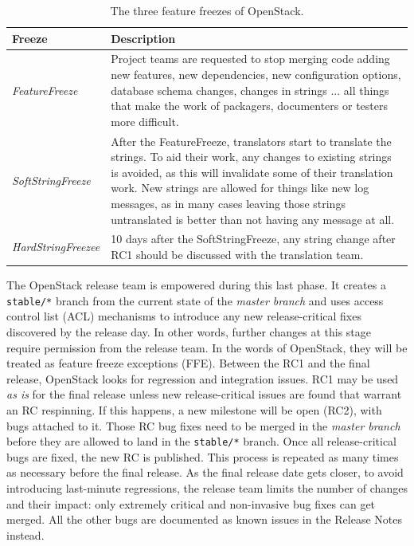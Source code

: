 \documentclass[dvipsnames]{interact}
\theoremstyle{plain}\newtheorem{theorem}{Theorem}[section]
\theoremstyle{definition}
\theoremstyle{remark}
\begin{document}
\begin{table}
\centering
\renewcommand{\arraystretch}{1.3}
\caption{The three feature freezes of OpenStack.\label{t:3freezes}}
\begin{tabularx}{\textwidth}[]{
m{}
m{}
}
\toprule
Freeze & Description \\
\midrule 
\emph{FeatureFreeze} & Project teams are requested to stop merging code adding new features, new dependencies, new configuration options, database schema changes, changes in strings ... all things that make the work of packagers, documenters or testers more difficult. \\
\emph{SoftStringFreeze} &  After the FeatureFreeze, translators start to translate the strings. To aid their work, any changes to existing strings is avoided, as this will invalidate some of their translation work. New strings are allowed for things like new log messages, as in many cases leaving those strings untranslated is better than not having any message at all.\\
\emph{HardStringFreezee} & 10 days after the SoftStringFreeze,  any string change after RC1 should be discussed with the translation team.\\
\bottomrule
\end{tabularx}
\end{table}


The OpenStack release team is empowered during this last phase. It creates a \texttt{stable/*} branch from the current state of the \emph{master branch} and uses access control list (ACL) mechanisms to introduce any new release-critical fixes discovered by the release day.  In other words, further changes at this stage require permission from the release team. In the words of OpenStack, they will be treated as feature freeze exceptions (FFE). Between the RC1 and the final release, OpenStack looks for regression and integration issues. RC1 may be used \emph{as is} for the final release unless new release-critical issues are found that warrant an RC respinning. If this happens, a new milestone will be open (RC2), with bugs attached to it. Those RC bug fixes need to be merged in the \emph{master branch} before they are allowed to land in the \texttt{stable/*}  branch. Once all release-critical bugs are fixed, the new RC is published. This process is repeated as many times as necessary before the final release. As the final release date gets closer, to avoid introducing last-minute regressions, the release team limits the number of changes and their impact: only extremely critical and non-invasive bug fixes can get merged. All the other bugs are documented as known issues in the Release Notes instead. 
\end{document}
